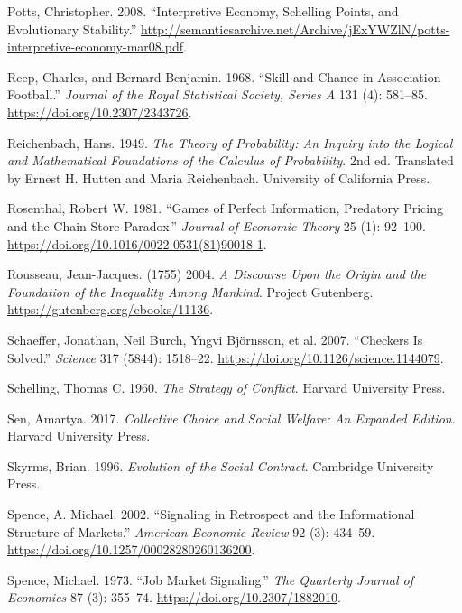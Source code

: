 \documentclass[
  11pt,
  letterpaper,
]{scrbook}
\newlength{\cslhangindent}
\newenvironment{CSLReferences}[2] %
 {\begin{list}{}{%
  \setlength{\itemindent}{0pt}
  \setlength{\leftmargin}{0pt}
  \setlength{\parsep}{0pt}
  \ifodd #1
   \setlength{\leftmargin}{\cslhangindent}
   \setlength{\itemindent}{-1\cslhangindent}
  \fi
  \setlength{\itemsep}{#2\baselineskip}}}
 {\end{list}}
\begin{document}
\begin{CSLReferences}{1}{1}
Potts, Christopher. 2008. {``Interpretive Economy, {S}chelling Points,
and Evolutionary Stability.''}
\url{http://semanticsarchive.net/Archive/jExYWZlN/potts-interpretive-economy-mar08.pdf}.

Reep, Charles, and Bernard Benjamin. 1968. {``Skill and Chance in
Association Football.''} \emph{Journal of the Royal Statistical Society,
Series A} 131 (4): 581--85. \url{https://doi.org/10.2307/2343726}.

Reichenbach, Hans. 1949. \emph{The Theory of Probability: An Inquiry
into the Logical and Mathematical Foundations of the Calculus of
Probability}. 2nd ed. Translated by Ernest H. Hutten and Maria
Reichenbach. University of California Press.

Rosenthal, Robert W. 1981. {``Games of Perfect Information, Predatory
Pricing and the Chain-Store Paradox.''} \emph{Journal of Economic
Theory} 25 (1): 92--100.
\url{https://doi.org/10.1016/0022-0531(81)90018-1}.

Rousseau, Jean-Jacques. (1755) 2004. \emph{A Discourse Upon the Origin
and the Foundation of the Inequality Among Mankind}. Project Gutenberg.
\url{https://gutenberg.org/ebooks/11136}.

Schaeffer, Jonathan, Neil Burch, Yngvi Björnsson, et al. 2007.
{``Checkers Is Solved.''} \emph{Science} 317 (5844): 1518--22.
\url{https://doi.org/10.1126/science.1144079}.

Schelling, Thomas C. 1960. \emph{The Strategy of Conflict}. Harvard
University Press.

Sen, Amartya. 2017. \emph{Collective Choice and Social Welfare: An
Expanded Edition}. Harvard University Press.

Skyrms, Brian. 1996. \emph{Evolution of the Social Contract}. Cambridge
University Press.

Spence, A. Michael. 2002. {``Signaling in Retrospect and the
Informational Structure of Markets.''} \emph{American Economic Review}
92 (3): 434--59. \url{https://doi.org/10.1257/00028280260136200}.

Spence, Michael. 1973. {``Job Market Signaling.''} \emph{The Quarterly
Journal of Economics} 87 (3): 355--74.
\url{https://doi.org/10.2307/1882010}.


\end{CSLReferences}
\end{document}
